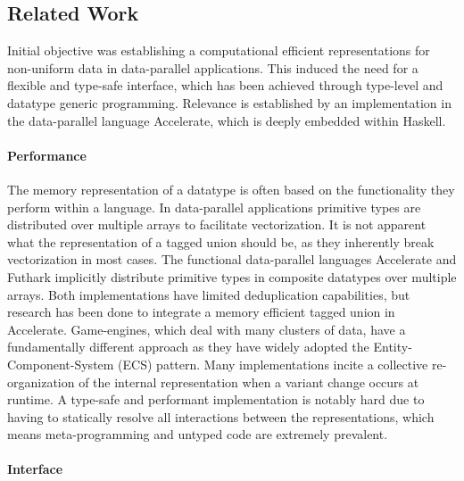 \documentclass{article}
\begin{document}
\subsection{Related Work}

Initial objective was establishing a computational efficient representations for non-uniform data in data-parallel applications.
This induced the need for a flexible and type-safe interface, which has been achieved through type-level and datatype generic programming.
Relevance is established by an implementation in the data-parallel language Accelerate, which is deeply embedded within Haskell.

\paragraph{Performance}

The memory representation of a datatype is often based on the functionality they perform within a language.
In data-parallel applications primitive types are distributed over multiple arrays to facilitate vectorization.
It is not apparent what the representation of a tagged union should be, as they inherently break vectorization in most cases. 
The functional data-parallel languages Accelerate\cite{accelerate-sum-types} and Futhark\cite{futhark-sum-types} implicitly distribute primitive types in composite datatypes over multiple arrays.
Both implementations have limited deduplication capabilities, but research has been done to integrate a memory efficient tagged union in Accelerate\cite{accelerate-sum-types}.
Game-engines, which deal with many clusters of data, have a fundamentally different approach as they have widely adopted the Entity-Component-System (ECS) pattern. 
Many implementations incite a collective re-organization of the internal representation when a variant change occurs at runtime.
A type-safe and performant implementation is notably hard due to having to statically resolve all interactions between the representations, which means meta-programming and untyped code are extremely prevalent. 

\paragraph{Interface}
\end{document}
